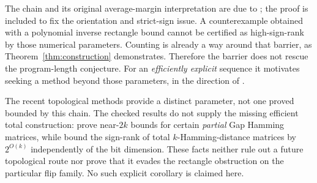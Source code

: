 The chain and its original average-margin interpretation are due to \citet{HHPTZ22}; the proof is included to fix the orientation and strict-sign issue. A counterexample obtained with a polynomial inverse rectangle bound cannot be certified as high-sign-rank by those numerical parameters. Counting is already a way around that barrier, as Theorem~\ref{thm:construction} demonstrates. Therefore the barrier does not rescue the program-length conjecture. For an \emph{efficiently explicit} sequence it motivates seeking a method beyond those parameters, in the direction of \citet[Problem~4.1]{HHPTZ22}.

The recent topological methods provide a distinct parameter, not one proved bounded by this chain. The checked results do not supply the missing efficient total construction: \citet{FHV26} prove near-$2k$ bounds for certain \emph{partial} Gap Hamming matrices, while \citet{GHIS25} bound the sign-rank of total $k$-Hamming-distance matrices by $2^{O(k)}$ independently of the bit dimension. These facts neither rule out a future topological route nor prove that it evades the rectangle obstruction on the particular flip family. No such explicit corollary is claimed here.



